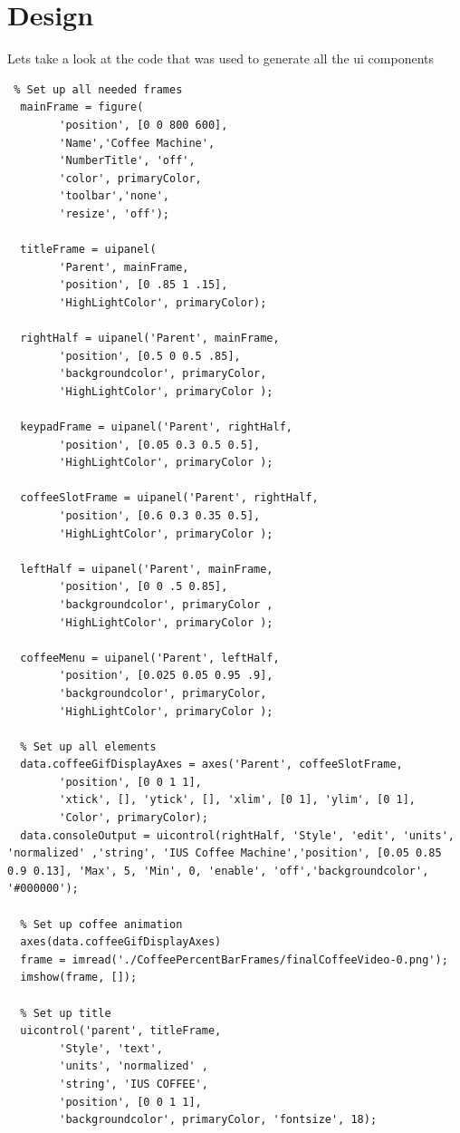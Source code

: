 \documentclass[a4paper, 10pt]{article}
\begin{document}
	\section{Design}
		\noindent Lets take a look at the code that was used to generate all the ui components
		\begin{lstlisting}
 % Set up all needed frames
  mainFrame = figure(
		'position', [0 0 800 600],
		'Name','Coffee Machine',
		'NumberTitle', 'off',
		'color', primaryColor,
		'toolbar','none',
		'resize', 'off');

  titleFrame = uipanel(
		'Parent', mainFrame,
		'position', [0 .85 1 .15],
		'HighLightColor', primaryColor);

  rightHalf = uipanel('Parent', mainFrame,
		'position', [0.5 0 0.5 .85],
		'backgroundcolor', primaryColor,
		'HighLightColor', primaryColor );

  keypadFrame = uipanel('Parent', rightHalf,
		'position', [0.05 0.3 0.5 0.5],
		'HighLightColor', primaryColor );

  coffeeSlotFrame = uipanel('Parent', rightHalf,
		'position', [0.6 0.3 0.35 0.5],
		'HighLightColor', primaryColor );

  leftHalf = uipanel('Parent', mainFrame,
		'position', [0 0 .5 0.85],
		'backgroundcolor', primaryColor ,
		'HighLightColor', primaryColor );
		
  coffeeMenu = uipanel('Parent', leftHalf,
		'position', [0.025 0.05 0.95 .9],
		'backgroundcolor', primaryColor,
		'HighLightColor', primaryColor );

  % Set up all elements
  data.coffeeGifDisplayAxes = axes('Parent', coffeeSlotFrame,
		'position', [0 0 1 1],
		'xtick', [], 'ytick', [], 'xlim', [0 1], 'ylim', [0 1],
		'Color', primaryColor);
  data.consoleOutput = uicontrol(rightHalf, 'Style', 'edit', 'units', 'normalized' ,'string', 'IUS Coffee Machine','position', [0.05 0.85 0.9 0.13], 'Max', 5, 'Min', 0, 'enable', 'off','backgroundcolor', '#000000');

  % Set up coffee animation
  axes(data.coffeeGifDisplayAxes)
  frame = imread('./CoffeePercentBarFrames/finalCoffeeVideo-0.png');
  imshow(frame, []);

  % Set up title
  uicontrol('parent', titleFrame,
		'Style', 'text',
		'units', 'normalized' ,
		'string', 'IUS COFFEE',
		'position', [0 0 1 1],
		'backgroundcolor', primaryColor, 'fontsize', 18);

		\end{lstlisting}
\end{document}
